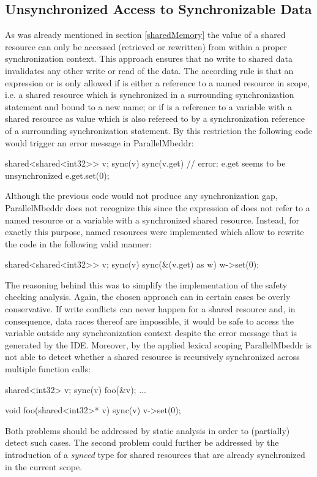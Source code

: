 \subsection{Unsynchronized Access to Synchronizable Data}
As was already mentioned in section \ref*{sharedMemory} the value of a shared resource can only be accessed (retrieved or rewritten) from within a proper synchronization context. This approach ensures that no write to shared data invalidates any other write or read of the data. The according rule is that an expression  or  is only allowed if  is either a reference to a named resource in scope, i.e. a shared resource which is synchronized in a surrounding synchronization statement and bound to a new name; or if  is a reference to a variable with a shared resource as value which is also refereed to by a synchronization reference of a surrounding synchronization statement. By this restriction the following code would trigger an error message in ParallelMbeddr:
\begin{ccode}
shared<shared<int32>> v;
sync(v) {
  sync(v.get) {
    // error: e.get seems to be unsynchronized
    e.get.set(0);
  }
}
\end{ccode}
Although the previous code would not produce any synchronization gap, ParallelMbeddr does not recognize this since the expression  of  does not refer to a named resource or a variable with a synchronized shared resource. Instead, for exactly this purpose, named resources were implemented which allow to rewrite the code in the following valid manner:
\begin{ccode}
shared<shared<int32>> v;
sync(v) {
  sync(&(v.get) as w) {
    w->set(0);
  }
}
\end{ccode}
The reasoning behind this was to simplify the implementation of the safety checking analysis. Again, the chosen approach can in certain cases be overly conservative. If write conflicts can never happen for a shared resource and, in consequence, data races thereof are impossible, it would be safe to access the variable outside any synchronization context despite the error message that is generated by the IDE. Moreover, by the applied lexical scoping ParallelMbeddr is not able to detect whether a shared resource is recursively synchronized across multiple function calls:
\begin{ccode}
  shared<int32> v;
  sync(v) { foo(&v); }
  ...

void foo(shared<int32>* v) {
  sync(v) { v->set(0); }
}
\end{ccode}
Both problems should be addressed by static analysis in order to (partially) detect such cases. The second problem could further be addressed by the introduction of a \textit{synced} type for shared resources that are already synchronized in the current scope.

